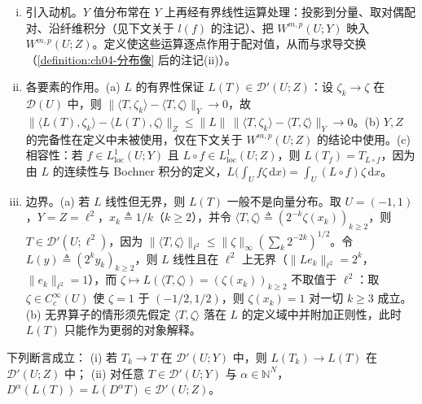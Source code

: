 \documentclass[../../main.tex]{subfiles}%
\begin{document}
\begin{remark}\label{remark:ch04-分布像动机}
\begin{enumerate}[(i)]
\item 引入动机。$Y$ 值分布常在 $Y$ 上再经有界线性运算处理：投影到分量、取对偶配对、沿纤维积分（见下文关于 $l(f)$ 的注记）、把 $W^{m,p}(U;Y)$ 映入 $W^{m,p}(U;Z)$。定义使这些运算逐点作用于配对值，从而与求导交换（\cref{definition:ch04-分布像} 后的注记(ii)）。

\item 各要素的作用。(a) $L$ 的有界性保证 $L(T)\in\mathcal{D}'(U;Z)$：设 $\zeta_k\to\zeta$ 在 $\mathcal{D}(U)$ 中，则 $\|\langle T,\zeta_k\rangle-\langle T,\zeta\rangle\|_Y\to0$，故 $\|\langle L(T),\zeta_k\rangle-\langle L(T),\zeta\rangle\|_Z\leqslant\|L\|\,\|\langle T,\zeta_k\rangle-\langle T,\zeta\rangle\|_Y\to0$。(b) $Y,Z$ 的完备性在定义中未被使用，仅在下文关于 $W^{m,p}(U;Z)$ 的结论中使用。(c) 相容性：若 $f\in L^1_{\mathrm{loc}}(U;Y)$ 且 $L\circ f\in L^1_{\mathrm{loc}}(U;Z)$，则 $L(T_f)=T_{L\circ f}$，因为由 $L$ 的连续性与 Bochner 积分的定义，$L\big(\int_Uf\zeta\,\mathrm{d}x\big)=\int_U(L\circ f)\zeta\,\mathrm{d}x$。

\item 边界。(a) 若 $L$ 线性但无界，则 $L(T)$ 一般不是向量分布。取 $U=(-1,1)$，$Y=Z=\ell^2$，$x_k\triangleq1/k$（$k\geqslant2$），并令 $\langle T,\zeta\rangle\triangleq(2^{-k}\zeta(x_k))_{k\geqslant2}$，则 $T\in\mathcal{D}'(U;\ell^2)$，因为 $\|\langle T,\zeta\rangle\|_{\ell^2}\leqslant\|\zeta\|_\infty(\sum_k2^{-2k})^{1/2}$。令 $L(y)\triangleq(2^ky_k)_{k\geqslant2}$，则 $L$ 线性且在 $\ell^2$ 上无界（$\|Le_k\|_{\ell^2}=2^k$，$\|e_k\|_{\ell^2}=1$），而 $\zeta\mapsto L(\langle T,\zeta\rangle)=(\zeta(x_k))_{k\geqslant2}$ 不取值于 $\ell^2$：取 $\zeta\in C_c^\infty(U)$ 使 $\zeta=1$ 于 $(-1/2,1/2)$，则 $\zeta(x_k)=1$ 对一切 $k\geqslant3$ 成立。(b) 无界算子的情形须先假定 $\langle T,\zeta\rangle$ 落在 $L$ 的定义域中并附加正则性，此时 $L(T)$ 只能作为更弱的对象解释。
\end{enumerate}
\end{remark}

\begin{remark}\label{remark:ch04-分布像性质}
下列断言成立：
(i) 若 $T_k\to T$ 在 $\mathcal{D}'(U;Y)$ 中，则 $L(T_k)\to L(T)$ 在 $\mathcal{D}'(U;Z)$ 中；
(ii) 对任意 $T\in\mathcal{D}'(U;Y)$ 与 $\alpha\in\mathbb{N}^N$，$D^\alpha(L(T))=L(D^\alpha T)\in\mathcal{D}'(U;Z)$。
\end{remark}
\end{document}
